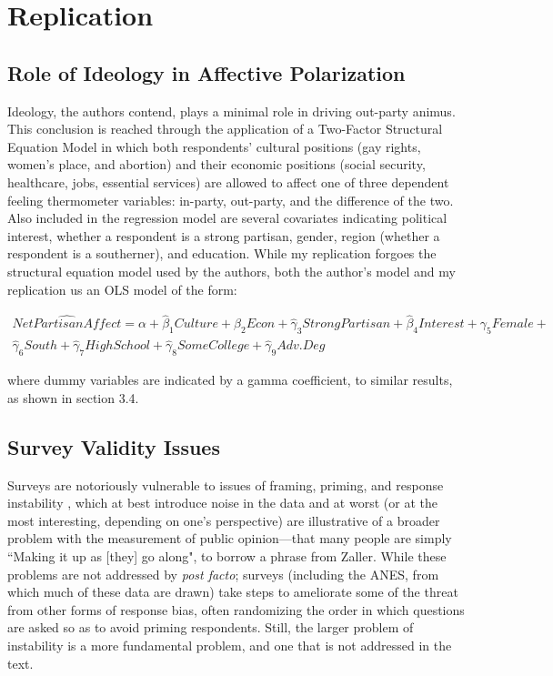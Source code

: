 \documentclass[12pt]{article}
\begin{document}
\section{Replication}

\subsection{Role of Ideology in Affective Polarization}

Ideology, the authors contend, plays a minimal role in driving out-party animus. This conclusion is reached through the application of a Two-Factor Structural Equation Model in which both respondents' cultural positions (gay rights, women's place, and abortion) and their economic positions (social security, healthcare, jobs, essential services) are allowed to affect one of three dependent feeling thermometer variables: in-party, out-party, and the difference of the two. Also included in the regression model are several covariates indicating political interest, whether a respondent is a strong partisan, gender, region (whether a respondent is a southerner), and education. While my replication forgoes the structural equation model used by the authors, both the author's model and my replication us an OLS model of the form:

\begin{equation}
\begin{split}
\hat{\mathit{Net Partisan Affect}} = \alpha + \hat{\beta}_1{\mathit{Culture}} + \hat{\beta}_2\mathit{Econ} + \hat{\gamma}_3\mathit{Strong Partisan} +  \hat{\beta}_4\mathit{Interest} +  \gamma_5\mathit{Female} + \\ \hat{\gamma}_6\mathit{South} + \hat{\gamma}_7\mathit{High School} + \hat{\gamma}_8\mathit{Some College} + \hat{\gamma}_9\mathit{Adv. Deg}
\end{split}
\end{equation}

\noindent where dummy variables are indicated by a gamma coefficient, to similar results, as shown in section 3.4.

\subsection{Survey Validity Issues}

Surveys are notoriously vulnerable to issues of framing, priming, and response instability \citep[p. 53--75]{zaller1992nature}, which at best introduce noise in the data and at worst (or at the most interesting, depending on one's perspective) are illustrative of a broader problem with the measurement of public opinion---that many people are simply ``Making it up as [they] go along", to borrow a phrase from Zaller. While these problems are not addressed by \citeauthor{iyengar2012affect} \textit{post facto}; surveys (including the ANES, from which much of these data are drawn) take steps to ameliorate some of the threat from other forms of response bias, often randomizing the order in which questions are asked so as to avoid priming respondents. Still, the larger problem of instability is a more fundamental problem, and one that is not addressed in the text.
\end{document}
